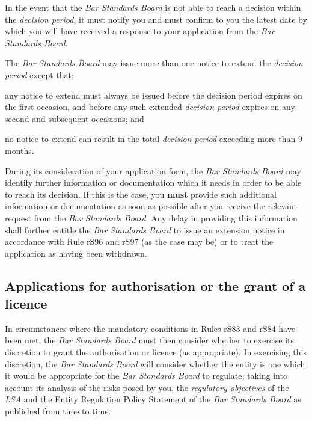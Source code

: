 
In the event that the \emph{Bar Standards Board} is not able to reach a
decision within the \emph{decision period}, it must notify you and must
confirm to you the latest date by which you will have received a
response to your application from the \emph{Bar Standards Board}.


The \emph{Bar Standards Board} may issue more than one notice to extend
the \emph{decision period} except that:\nl\item any notice to extend must always be issued before the decision period
expires on the first occasion, and before any such extended
\emph{decision period} expires on any second and subsequent occasions;
and
\item no notice to extend can result in the total \emph{decision period}
exceeding more than 9 months.
\ln
{}

During its consideration of your application form, the \emph{Bar
Standards Board} may identify further information or documentation which
it needs in order to be able to reach its decision. If this is the case,
you \textcolor{myred}{\textbf{must }}provide such additional information or documentation as soon as
possible after you receive the relevant request from the \emph{Bar
Standards Board}. Any delay in providing this information shall further
entitle the \emph{Bar Standards Board} to issue an extension notice in
accordance with Rule rS96 and rS97 (as the case may be) or to treat the
application as having been withdrawn.



\subsection{Applications for authorisation or the grant of a licence}


In circumstances where the mandatory conditions in Rules rS83 and rS84
have been met, the \emph{Bar Standards Board} must then consider whether
to exercise its discretion to grant the authorisation or licence (as
appropriate). In exercising this discretion, the \emph{Bar Standards
Board} will consider whether the entity is one which it would be
appropriate for the \emph{Bar Standards Board} to regulate, taking into
account its analysis of the risks posed by you, the \emph{regulatory
objectives} of the \emph{LSA} and the Entity Regulation Policy Statement
of the \emph{Bar Standards Board} as published from time to time.

